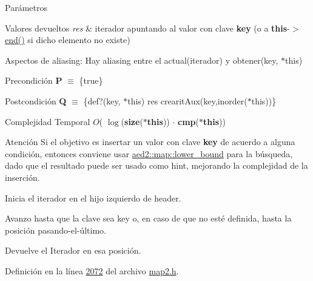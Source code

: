\begin{DoxyParams}{\-Parámetros}
\begin{DoxyRetVals}{Valores devueltos}
{\em res} & iterador apuntando al valor con clave {\bfseries key} (o a {\bfseries this}-\/$>$\hyperlink{classaed2_1_1iterator_a67caf9468be999e9be96b7add5d79946_a67caf9468be999e9be96b7add5d79946}{end()} si dicho elemento no existe)\\
\hline
\end{DoxyRetVals}
\begin{DoxyParagraph}{Aspectos de aliasing\+:}
Hay aliasing entre el actual(iterador) y obtener(key, $\ast$this)
\end{DoxyParagraph}
\begin{DoxyPrecond}{Precondición}
{\bfseries P} $\equiv$ \{true\} 
\end{DoxyPrecond}
\begin{DoxyPostcond}{Postcondición}
{\bfseries Q} $\equiv$ \{def?(key, $\ast$this)  res  crearit\+Aux(key,inorder($\ast$this))\}
\end{DoxyPostcond}

\begin{DoxyDescription}
\item[Complejidad Temporal]$O$( $\log$({\bfseries size}({\bfseries $\ast$this})) $\cdot$ {\bfseries cmp}({\bfseries $\ast$this}))
\end{DoxyDescription}

\begin{DoxyAttention}{Atención}
Si el objetivo es insertar un valor con clave {\bfseries key} de acuerdo a alguna condición, entonces conviene usar \hyperlink{classaed2_1_1map_a62075a47afdf89267c5462f88164af3d_a62075a47afdf89267c5462f88164af3d}{aed2\+::map\+::lower\+\_\+bound} para la búsqueda, dado que el resultado puede ser usado como hint, mejorando la complejidad de la inserción.
\begin{DoxyItemize}
\item Inicia el iterador en el hijo izquierdo de header.
\item Avanzo hasta que la clave sea key o, en caso de que no esté definida, hasta la posición pasando-\/el-\/último.
\item Devuelve el Iterador en esa posición. 
\end{DoxyItemize}
\end{DoxyAttention}


Definición en la línea \hyperlink{map2_8h_source_l02072}{2072} del archivo \hyperlink{map2_8h_source}{map2.\+h}.

\mbox{\label{classaed2_1_1iterator_a21b4a52c60fc70ef482e174325e8fec5_a21b4a52c60fc70ef482e174325e8fec5}} 

\end{DoxyParams}
